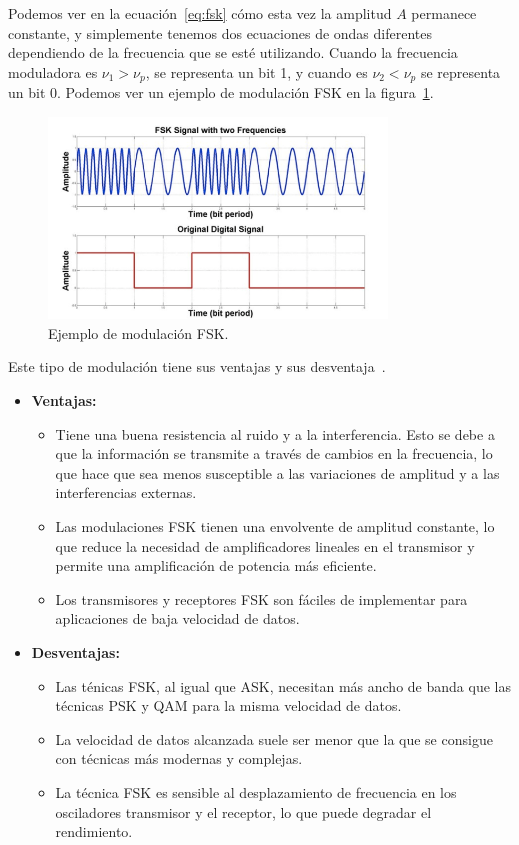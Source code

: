 \documentclass[12pt, letterpaper]{article}
\begin{document}
Podemos ver en la ecuación~\ref{eq:fsk} cómo esta vez la amplitud $A$ permanece constante, y simplemente tenemos dos ecuaciones de ondas diferentes dependiendo de la frecuencia que se esté utilizando. Cuando la frecuencia moduladora es $\nu_1 > \nu_p$, se representa un bit 1, y cuando es $\nu_2 < \nu_p$ se representa un bit 0. Podemos ver un ejemplo de modulación FSK en la figura~\ref{fig:fsk}.
\begin{figure}[h]
    \centering
    \includegraphics[width=9cm]{images/FSK.png}
\caption{Ejemplo de modulación FSK.\label{fig:fsk}}
\end{figure}

Este tipo de modulación tiene sus ventajas y sus desventaja~\cite{ask-unidad3}.
\begin{itemize}
    \item \textbf{Ventajas:}
    \begin{itemize}
        \item Tiene una buena resistencia al ruido y a la interferencia. Esto se debe a que la información se transmite a través de cambios en la frecuencia, lo que hace que sea menos susceptible a las variaciones de amplitud y a las interferencias externas.
        \item Las modulaciones FSK tienen una envolvente de amplitud constante, lo que reduce la necesidad de amplificadores lineales en el transmisor y permite una amplificación de potencia más eficiente.
        \item Los transmisores y receptores FSK son fáciles de implementar para aplicaciones de baja velocidad de datos.
    \end{itemize}

    \item \textbf{Desventajas:}
    \begin{itemize}
        \item Las ténicas FSK, al igual que ASK, necesitan más ancho de banda que las técnicas PSK y QAM para la misma velocidad de datos. 
        \item La velocidad de datos alcanzada suele ser menor que la que se consigue con técnicas más modernas y complejas.
        \item La técnica FSK es sensible al desplazamiento de frecuencia en los osciladores transmisor y el receptor, lo que puede degradar el rendimiento.
    \end{itemize}
\end{itemize}
\end{document}
